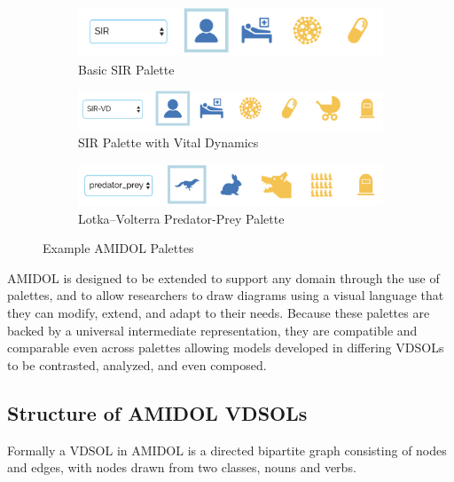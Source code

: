 \documentclass[11pt]{article}
\newcommand{\amidol}{\textsc{AMIDOL}}
\begin{document}
\begin{figure}
  \begin{subfigure}[b]{\textwidth}
    \includegraphics[width=\textwidth]{figs/SIR-palette.png}
    \caption{Basic SIR Palette}
    \label{Fig:SIRPalette}
  \end{subfigure}
  \begin{subfigure}[b]{\textwidth}
    \includegraphics[width=\textwidth]{figs/SIR-VD-palette.png}
    \caption{SIR Palette with Vital Dynamics}
    \label{Fig:SIRVDPalette}
  \end{subfigure}
  \begin{subfigure}[b]{\textwidth}
    \includegraphics[width=\textwidth]{figs/PREDPREY-palette.png}
    \caption{Lotka–Volterra Predator-Prey Palette}
    \label{Fig:PREDPREYPalette}    
  \end{subfigure}
  \caption{Example \amidol{} Palettes}
  \label{Fig:Palettes}
\end{figure}

\amidol{} is designed to be extended to support any domain through the use of palettes, and to allow researchers to draw diagrams using a visual language that they can modify, extend, and adapt to their needs.  Because these palettes are backed by a universal intermediate representation, they are compatible and comparable even across palettes allowing models developed in differing VDSOLs to be contrasted, analyzed, and even composed.

\subsection{Structure of \amidol{} VDSOLs}

Formally a VDSOL in \amidol{} is a directed bipartite graph consisting of nodes and edges, with nodes drawn from two classes, nouns and verbs.
\end{document}
